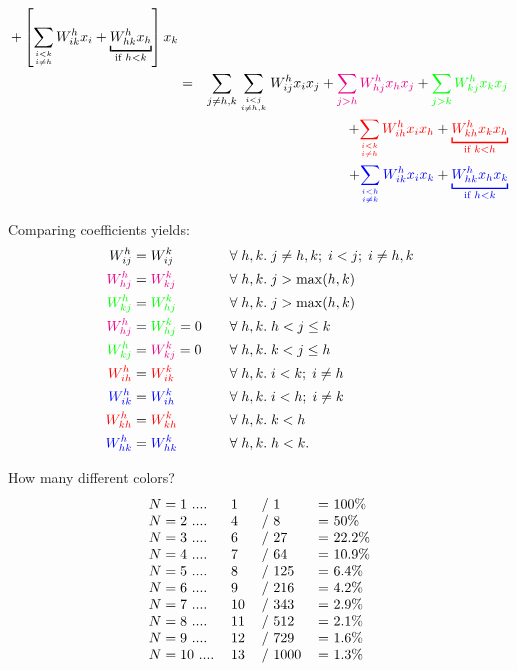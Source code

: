 \begin{eqnarray}
+ \left[ \sum_{i < k \atop i \neq h} W^h_{ik} x_i + \underbracket[1pt]{W^h_{hk} x_h}_{\text{if } h < k} \right] x_k \nonumber \\
&=& \sum_{j \neq h,k} \sum_{i < j \atop i \neq h,k} W^h_{ij} x_i x_j + {\color{magenta}\sum_{j > h} W^h_{hj} x_h x_j} + {\color{green}\sum_{j > k} W^h_{kj} x_k x_j} \nonumber \\
&& + {\color{red}\sum_{i < k \atop i \neq h} W^h_{ih} x_i x_h} + {\color{red}\underbracket[1pt]{W^h_{kh} x_k x_h}_{\text{if } k < h}} \nonumber \\
&& + {\color{blue}\sum_{i < h \atop i \neq k} W^h_{ik} x_i x_k} + {\color{blue}\underbracket[1pt]{W^h_{hk} x_h x_k}_ {\text{if } h < k}}
\end{eqnarray}

Comparing coefficients yields:
\begin{alignat}{3}
W_{ij}^h &= W_{ij}^k && \forall \; h,k. \; j \neq h,k; \; i < j; \; i \neq h,k \nonumber \\
{\color{magenta}W_{hj}^h} &= {\color{magenta}W_{kj}^k} && \forall \; h,k. \; j > \max(h,k) \nonumber \\
{\color{green}W_{kj}^h} &= {\color{green}W_{hj}^k} && \forall \; h,k. \; j > \max(h,k) \nonumber \\
{\color{magenta}W_{hj}^h} &= {\color{green}W_{hj}^k} = 0 \quad && \forall \; h,k. \; h < j \le k \nonumber \\
{\color{green}W_{kj}^h} &= {\color{magenta}W_{kj}^k} = 0 \quad && \forall \; h,k. \; k < j \le h \nonumber \\
{\color{red}W_{ih}^h} &= {\color{red}W_{ik}^k} && \forall \; h,k. \; i < k; \; i \neq h \nonumber \\
{\color{blue}W_{ik}^h} &= {\color{blue}W_{ih}^k} && \forall \; h,k. \; i < h; \; i \neq k \nonumber \\
{\color{red}W_{kh}^h} &= {\color{red}W_{kh}^k} && \forall \; h,k. \; k < h \nonumber \\
{\color{blue}W_{hk}^h} &= {\color{blue}W_{hk}^k} && \forall \; h,k. \; h < k .
\end{alignat}

How many different colors?
\begin{equation}
\begin{tabular}{l l l l}
$N = 1$ .... & 1 & / 1 & = 100\% \\
$N = 2$ .... & 4 & / 8 & = 50\% \\
$N = 3$ .... & 6 & / 27 & = 22.2\% \\
$N = 4$ .... & 7 & / 64 & = 10.9\% \\
$N = 5$ .... & 8 & / 125 & = 6.4\% \\
$N = 6$ .... & 9 & / 216 & = 4.2\% \\
$N = 7$ .... & 10 & / 343 & = 2.9\% \\
$N = 8$ .... & 11 & / 512 & = 2.1\% \\
$N = 9$ .... & 12 & / 729 & = 1.6\% \\
$N = 10$ .... & 13 & / 1000 & = 1.3\%
\end{tabular}
\end{equation}

